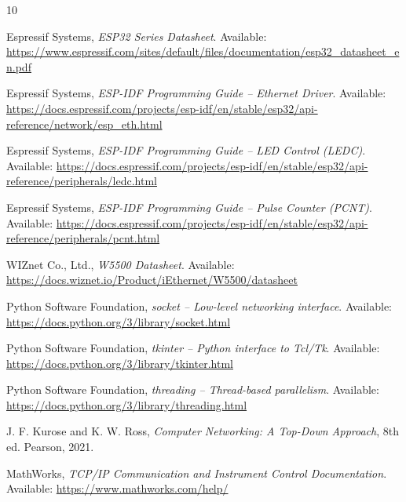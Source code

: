 \documentclass[12pt,a4paper]{report}
\begin{document}
\begingroup
\small
\sloppy
\begin{thebibliography}{10}

Espressif Systems, \textit{ESP32 Series Datasheet}.
Available: \url{https://www.espressif.com/sites/default/files/documentation/esp32_datasheet_en.pdf}

Espressif Systems, \textit{ESP-IDF Programming Guide -- Ethernet Driver}.
Available: \url{https://docs.espressif.com/projects/esp-idf/en/stable/esp32/api-reference/network/esp_eth.html}

Espressif Systems, \textit{ESP-IDF Programming Guide -- LED Control (LEDC)}.
Available: \url{https://docs.espressif.com/projects/esp-idf/en/stable/esp32/api-reference/peripherals/ledc.html}

Espressif Systems, \textit{ESP-IDF Programming Guide -- Pulse Counter (PCNT)}.
Available: \url{https://docs.espressif.com/projects/esp-idf/en/stable/esp32/api-reference/peripherals/pcnt.html}

WIZnet Co., Ltd., \textit{W5500 Datasheet}.
Available: \url{https://docs.wiznet.io/Product/iEthernet/W5500/datasheet}

Python Software Foundation, \textit{socket -- Low-level networking interface}.
Available: \url{https://docs.python.org/3/library/socket.html}

Python Software Foundation, \textit{tkinter -- Python interface to Tcl/Tk}.
Available: \url{https://docs.python.org/3/library/tkinter.html}

Python Software Foundation, \textit{threading -- Thread-based parallelism}.
Available: \url{https://docs.python.org/3/library/threading.html}

J. F. Kurose and K. W. Ross, \textit{Computer Networking: A Top-Down Approach}, 8th ed.
Pearson, 2021.

MathWorks, \textit{TCP/IP Communication and Instrument Control Documentation}.
Available: \url{https://www.mathworks.com/help/}

\end{thebibliography}
\endgroup
\end{document}
